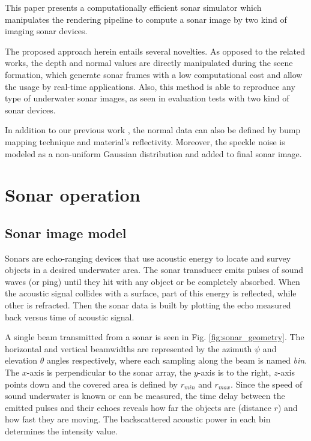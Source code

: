 \documentclass[final,5p,times]{elsarticle}
\begin{document}
This paper presents a computationally efficient sonar simulator which manipulates the rendering pipeline to compute a sonar image by two kind of imaging sonar devices.

The proposed approach herein entails several novelties. As opposed to the related works, the depth and normal values are directly manipulated during the scene formation, which generate sonar frames with a low computational cost and allow the usage by real-time applications. Also, this method is able to reproduce any type of underwater sonar images, as seen in evaluation tests with two kind of sonar devices.

In addition to our previous work \cite{cerqueira2016}, the normal data can also be defined by bump mapping technique and material's reflectivity. Moreover, the speckle noise is modeled as a non-uniform Gaussian distribution and added to final sonar image.


\section{Sonar operation}
\label{background}

\subsection{Sonar image model}
\label{sonar:model}

Sonars are echo-ranging devices that use acoustic energy to locate and survey objects in a desired underwater area. The sonar transducer emits pulses of sound waves (or ping) until they hit with any object or be completely absorbed. When the acoustic signal collides with a surface, part of this energy is reflected, while other is refracted. Then the sonar data is built by plotting the echo measured back versus time of acoustic signal.

A single beam transmitted from a sonar is seen in Fig. \ref{fig:sonar_geometry}. The horizontal and vertical beamwidths are represented by the azimuth $\psi$ and elevation $\theta$ angles respectively, where each sampling along the beam is named \textit{bin}. The $x$-axis is perpendicular to the sonar array, the $y$-axis is to the right, $z$-axis points down and the covered area is defined by $r_{min}$ and $r_{max}$. Since the speed of sound underwater is known or can be measured, the time delay between the emitted pulses and their echoes reveals how far the objects are (distance $r$) and how fast they are moving. The backscattered acoustic power in each bin determines the intensity value.
\end{document}
